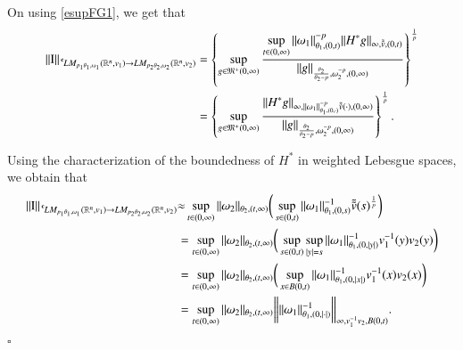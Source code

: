 \documentclass[11pt]{amsart}
\theoremstyle{plain}
\theoremstyle{definition}
\numberwithin{thm}{section}
\numberwithin{equation}{section}
\begin{document}
On using \eqref{esupFG1}, we get that
\begin{align*}
\|{\operatorname{I}}\|_{{\,^{^{\bf c}}\!} LM_{p_1{\theta}_1,{\omega}_1}({{\mathbb R}^n},v_1){\rightarrow} LM_{p_2{\theta}_2,{\omega}_2}({{\mathbb R}^n},v_2)} & = \left\{ \sup_{g\in {\mathfrak M}^+(0,\infty)} {\frac{\displaystyle {\sup_{t\in (0,\infty)} \|{\omega}_1\|_{{\theta}_1,(0,t)}^{-p} \|H^*g\|_{\infty,\tilde{\tilde {v}}, (0,t)}}}{\displaystyle {\|g\|_{\frac{{\theta}_2}{{\theta}_2-p},{\omega}_2^{-p},(0,\infty)}}}} \right\}^{\frac{1}{p}} \\
& = \left\{ \sup_{g\in {\mathfrak M}^+(0,\infty)} {\frac{\displaystyle { \|H^*g\|_{\infty,\|{\omega}_1\|_{{\theta}_1,(0,\cdot)}^{-p} \tilde{\tilde{v}}(\cdot),(0,\infty)}
}}{\displaystyle {\|g\|_{\frac{{\theta}_2}{{\theta}_2-p},{\omega}_2^{-p},(0,\infty)}}}} \right\}^{\frac{1}{p}}.
\end{align*}

Using the characterization of the boundedness of $H^*$ in weighted Lebesgue spaces, we obtain that
\begin{align*}
\|{\operatorname{I}}\|_{{\,^{^{\bf c}}\!} LM_{p_1{\theta}_1,{\omega}_1}({{\mathbb R}^n},v_1){\rightarrow} LM_{p_2{\theta}_2,{\omega}_2}({{\mathbb R}^n},v_2)} & {\approx} \sup_{t\in (0,\infty)} \|{\omega}_2\|_{{\theta}_2,(t,\infty)} \bigg(\sup_{s\in(0,t)} \|{\omega}_1\|_{{\theta}_1,(0,s)}^{-1} \tilde{\tilde v}(s)^{\frac{1}{p}}\bigg) \\
& = \sup_{t\in (0,\infty)} \|{\omega}_2\|_{{\theta}_2,(t,\infty)}
\bigg(\sup_{s\in (0,t)} \sup_{|y|=s} \|{\omega}_1\|_{{\theta}_1,(0,|y|)}^{-1} v_1^{-1}(y) v_2(y)\bigg)\\
& = \sup_{t\in (0,\infty)} \|{\omega}_2\|_{{\theta}_2,(t,\infty)}
\bigg(\sup_{x\in B(0,t)} \|{\omega}_1\|_{{\theta}_1,(0,|x|)}^{-1} v_1^{-1}(x) v_2(x)\bigg)\\  
& = \sup_{t\in (0,\infty)} \|{\omega}_2\|_{{\theta}_2,(t,\infty)}
\bigg\| \|{\omega}_1\|_{{\theta}_1,(0,|\cdot|)}^{-1} \bigg\|_{\infty,v_1^{-1} v_2,B(0,t)}.
\end{align*}

\hspace{16.9cm}$\square$
\end{document}
